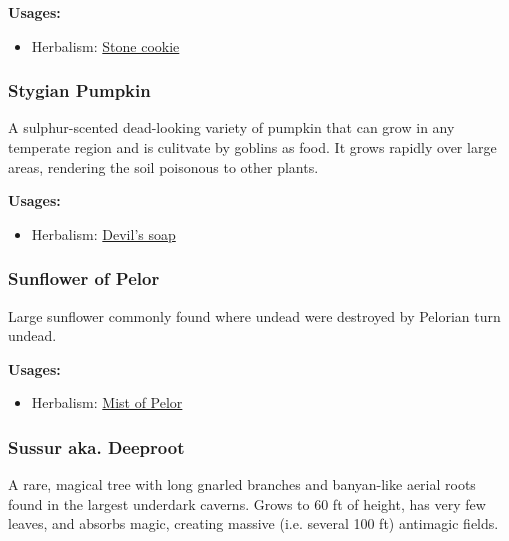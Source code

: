 \textbf{Usages:}

\begin{itemize}[noitemsep]
\item[] Herbalism: \hyperref[Stone cookie]{Stone cookie}
\end{itemize}

\subsubsection{Stygian Pumpkin}
\label{Stygian Pumpkin}

A sulphur-scented dead-looking variety of pumpkin that can grow in any temperate region and is culitvate by goblins as food. It grows rapidly over large areas, rendering the soil poisonous to other plants.

\vspace{5mm}

\textbf{Usages:}

\begin{itemize}[noitemsep]
\item[] Herbalism: \hyperref[Devil's soap]{Devil's soap}
\end{itemize}

\subsubsection{Sunflower of Pelor}
\label{Sunflower of Pelor}

Large sunflower commonly found where undead were destroyed by Pelorian turn undead.

\vspace{5mm}

\textbf{Usages:}

\begin{itemize}[noitemsep]
\item[] Herbalism: \hyperref[Mist of Pelor]{Mist of Pelor}
\end{itemize}

\subsubsection{Sussur aka. Deeproot}
\label{Sussur}

A rare, magical tree with long gnarled branches and banyan-like aerial roots found in the largest underdark caverns. Grows to 60 ft of height, has very few leaves, and absorbs magic, creating massive (i.e. several 100 ft) antimagic fields.

\vspace{5mm}

